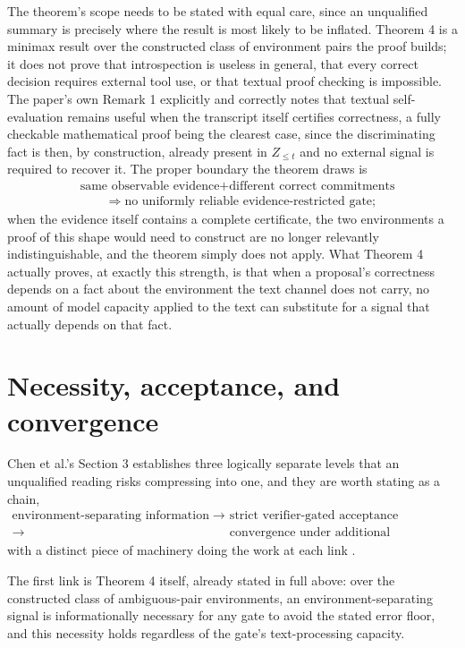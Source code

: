 \documentclass[11pt]{article}
\begin{document}
The theorem's scope needs to be stated with equal care, since an unqualified summary is precisely where the result is most likely to be inflated. Theorem 4 is a minimax result over the constructed class of environment pairs the proof builds; it does not prove that introspection is useless in general, that every correct decision requires external tool use, or that textual proof checking is impossible. The paper's own Remark 1 explicitly and correctly notes that textual self-evaluation remains useful when the transcript itself certifies correctness, a fully checkable mathematical proof being the clearest case, since the discriminating fact is then, by construction, already present in $Z_{\le t}$ and no external signal is required to recover it. The proper boundary the theorem draws is
\begin{align*}
&\text{same observable evidence} + \text{different correct commitments} \\
&\qquad \Rightarrow \text{no uniformly reliable evidence-restricted gate};
\end{align*}
when the evidence itself contains a complete certificate, the two environments a proof of this shape would need to construct are no longer relevantly indistinguishable, and the theorem simply does not apply. What Theorem 4 actually proves, at exactly this strength, is that when a proposal's correctness depends on a fact about the environment the text channel does not carry, no amount of model capacity applied to the text can substitute for a signal that actually depends on that fact.

\section{Necessity, acceptance, and convergence}

Chen et al.'s Section 3 establishes three logically separate levels that an unqualified reading risks compressing into one, and they are worth stating as a chain,
\begin{align*}
\text{environment-separating information} \;\rightarrow\; &\text{strict verifier-gated acceptance} \\
\rightarrow\; &\text{convergence under additional assumptions,}
\end{align*}
with a distinct piece of machinery doing the work at each link \cite{chen2026bilevel}.

The first link is Theorem 4 itself, already stated in full above: over the constructed class of ambiguous-pair environments, an environment-separating signal is informationally necessary for any gate to avoid the stated error floor, and this necessity holds regardless of the gate's text-processing capacity.
\end{document}
